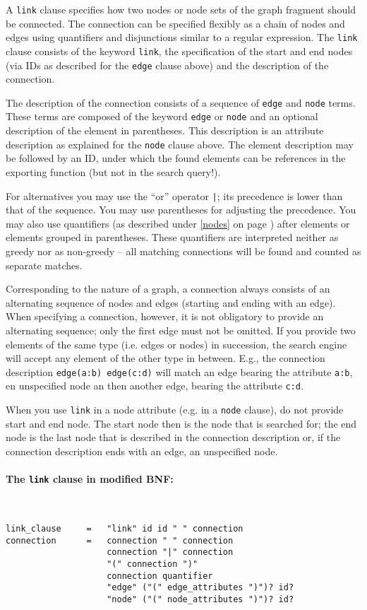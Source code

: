 \documentclass[12pt]{scrartcl}
\begin{document}
A \texttt{link} clause specifies how two nodes or node sets of the graph fragment should be connected.
The connection can be specified flexibly as a chain of nodes and edges using quantifiers and disjunctions similar to a regular expression.
The \texttt{link} clause consists of the keyword \texttt{link}, the specification of the start and end nodes (via IDs as described for the \texttt{edge} clause above) and the description of the connection.

The description of the connection consists of a sequence of \texttt{edge} and \texttt{node} terms.
These terms are composed of the keyword \texttt{edge} or \texttt{node} and an optional description of the element in parentheses.
This description is an attribute description as explained for the \texttt{node} clause above.
The element description may be followed by an ID, under which the found elements can be references in the exporting function (but not in the search query!).

For alternatives you may use the “or” operator \texttt{|}; its precedence is lower than that of the sequence.
You may use parentheses for adjusting the precedence.
You may also use quantifiers (as described under \ref{nodes} on page \pageref{quantifiers}) after elements or elements grouped in parentheses.
These quantifiers are interpreted neither as greedy nor as non-greedy – all matching connections will be found and counted as separate matches.

Corresponding to the nature of a graph, a connection always consists of an alternating sequence of nodes and edges (starting and ending with an edge).
When specifying a connection, however, it is not obligatory to provide an alternating sequence; only the first edge must not be omitted.
If you provide two elements of the same type (i.e. edges or nodes) in succession, the search engine will accept any element of the other type in between.
E.g., the connection description \texttt{edge(a:b) edge(c:d)} will match an edge bearing the attribute \texttt{a:b}, en unspecified node an then another edge, bearing the attribute \texttt{c:d}.

When you use \texttt{link} in a node attribute (e.g. in a \texttt{node} clause), do not provide start and end node.
The start node then is the node that is searched for; the end node is the last node that is described in the connection description or, if the connection description ends with an edge, an unspecified node.


\paragraph*{The \texttt{link} clause in modified BNF:}
~
\begin{framed}
\begin{lstlisting}
link_clause     =   "link" id id " " connection
connection      =   connection " " connection
                    connection "|" connection
                    "(" connection ")"
                    connection quantifier
                    "edge" ("(" edge_attributes ")")? id?
                    "node" ("(" node_attributes ")")? id?
\end{lstlisting}
\end{framed}
\end{document}
